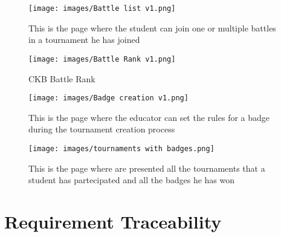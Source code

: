 \documentclass[a4paper, 11pt, titlepage]{article}
\begin{document}
\begin{figure}[H]
  \centering
  \texttt{[image: images/Battle list v1.png]}
  \caption{This is the page where the student can join one or multiple battles in a tournament he has joined}
  \label{fig:Battle_list}
\end{figure}

\begin{figure}[H]
  \centering
  \texttt{[image: images/Battle Rank v1.png]}
  \caption{CKB Battle Rank}
  \label{fig:Battle_rank}
\end{figure}

\begin{figure}[H]
  \centering
  \texttt{[image: images/Badge creation v1.png]}
  \caption{This is the page where the educator can set the rules for a badge during the tournament creation process}
  \label{fig:Badge_creation}
\end{figure}

\begin{figure}[H]
  \centering
  \texttt{[image: images/tournaments with badges.png]}
  \caption{This is the page where are presented all the tournaments that a student has partecipated and all the badges he has won}
  \label{fig:List_badges}
\end{figure}


\section{Requirement Traceability}
\end{document}
